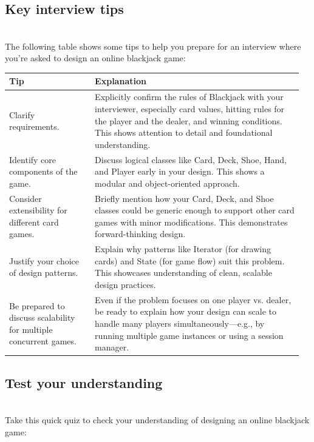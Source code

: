 \subsection{Key interview tips}\label{N4gsxS0DzIIbVWtxcZXjh}
\\
The following table shows some tips to help you prepare for an interview where you're asked to design an online blackjack game:

\begin{center}
\begin{tabular}{|p{0.28\linewidth}|p{0.68\linewidth}|}
\hline
\textbf{Tip} & \textbf{Explanation} \\
\hline

Clarify requirements. &
Explicitly confirm the rules of Blackjack with your interviewer, especially card values, hitting rules for the player and the dealer, and winning conditions. This shows attention to detail and foundational understanding. \\
\hline

Identify core components of the game. &
Discuss logical classes like Card, Deck, Shoe, Hand, and Player early in your design. This shows a modular and object-oriented approach. \\
\hline

Consider extensibility for different card games. &
Briefly mention how your Card, Deck, and Shoe classes could be generic enough to support other card games with minor modifications. This demonstrates forward-thinking design. \\
\hline

Justify your choice of design patterns. &
Explain why patterns like Iterator (for drawing cards) and State (for game flow) suit this problem. This showcases understanding of clean, scalable design practices. \\
\hline

Be prepared to discuss scalability for multiple concurrent games. &
Even if the problem focuses on one player vs. dealer, be ready to explain how your design can scale to handle many players simultaneously—e.g., by running multiple game instances or using a session manager. \\
\hline

\end{tabular}
\end{center}

\subsection{Test your understanding}\label{2I7Mr5mfph8iFXCiPpDo3}
\\
Take this quick quiz to check your understanding of designing an online blackjack game:

